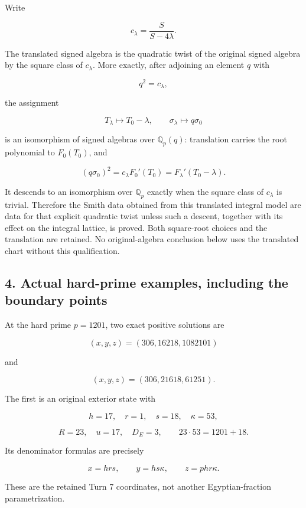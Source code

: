 Write

\[
c_\lambda=\frac S{S-4\lambda}.
\]

The translated signed algebra is the quadratic twist of the original
signed algebra by the square class of \(c_\lambda\). More exactly, after
adjoining an element \(q\) with

\[
q^2=c_\lambda,
\]

the assignment

\[
\boxed{
T_\lambda\longmapsto T_0-\lambda,
\qquad
\sigma_\lambda\longmapsto q\sigma_0
}
\]

is an isomorphism of signed algebras over \(\mathbb Q_p(q)\):
translation carries the root polynomial to \(F_0(T_0)\), and

\[
(q\sigma_0)^2
=c_\lambda F_0'(T_0)
=F_\lambda'(T_0-\lambda).
\]

It descends to an isomorphism over \(\mathbb Q_p\) exactly when the
square class of \(c_\lambda\) is trivial. Therefore the Smith data
obtained from this translated integral model are data for that explicit
quadratic twist unless such a descent, together with its effect on the
integral lattice, is proved. Both square-root choices and the
translation are retained. No original-algebra conclusion below uses the
translated chart without this qualification.

\subsection{4. Actual hard-prime examples, including the boundary
points}\label{actual-hard-prime-examples-including-the-boundary-points}

At the hard prime \(p=1201\), two exact positive solutions are

\[
( x,y,z )=(306,16218,1082101)
\tag{23}
\]

and

\[
( x,y,z )=(306,21618,61251).
\tag{24}
\]

The first is an original exterior state with

\[
h=17,\quad r=1,\quad s=18,\quad \kappa=53,
\]

\[
R=23,\quad u=17,\quad D_E=3,
\qquad
23\cdot53=1201+18.
\]

Its denominator formulas are precisely

\[
x=hrs,\qquad y=hs\kappa,\qquad z=phr\kappa.
\]

These are the retained Turn 7 coordinates, not another Egyptian-fraction
parametrization.

